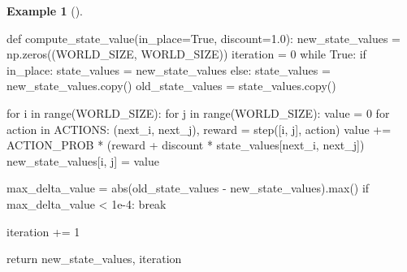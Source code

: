 \documentclass[
  letterpaper,
]{krantz}
\makeatletter
\newenvironment{Shaded}{\begin{snugshade}}{\end{snugshade}}
\newcommand{\BuiltInTok}[1]{\textcolor[rgb]{0.00,0.23,0.31}{#1}}
\newcommand{\ControlFlowTok}[1]{\textcolor[rgb]{0.00,0.23,0.31}{#1}}
\newcommand{\DecValTok}[1]{\textcolor[rgb]{0.68,0.00,0.00}{#1}}
\newcommand{\FloatTok}[1]{\textcolor[rgb]{0.68,0.00,0.00}{#1}}
\newcommand{\KeywordTok}[1]{\textcolor[rgb]{0.00,0.23,0.31}{#1}}
\newcommand{\NormalTok}[1]{\textcolor[rgb]{0.00,0.23,0.31}{#1}}
\newcommand{\OperatorTok}[1]{\textcolor[rgb]{0.37,0.37,0.37}{#1}}
\newcommand{\VariableTok}[1]{\textcolor[rgb]{0.07,0.07,0.07}{#1}}
\newenvironment{kframe}{%
\medskip{}
\setlength{\fboxsep}{.8em}
 \def\at@end@of@kframe{}%
 \ifinner\ifhmode%
  \def\at@end@of@kframe{\end{minipage}}%
  \begin{minipage}{\columnwidth}%
 \fi\fi%
 \def\FrameCommand##1{\hskip\@totalleftmargin \hskip-\fboxsep
 \colorbox{shadecolor}{##1}\hskip-\fboxsep
     \hskip-\linewidth \hskip-\@totalleftmargin \hskip\columnwidth}%
 \MakeFramed {\advance\hsize-\width
   \@totalleftmargin\z@ \linewidth\hsize
   \@setminipage}}%
 {\par\unskip\endMakeFramed%
 \at@end@of@kframe}
\renewenvironment{Shaded}{\begin{kframe}}{\end{kframe}}
\theoremstyle{plain}
\theoremstyle{definition}
\newtheorem{example}{Example}[chapter]
\theoremstyle{definition}
\theoremstyle{remark}
\makeatother
\begin{document}
\begin{example}[]
\begin{tcolorbox}[enhanced jigsaw, bottomrule=.15mm, opacityback=0, breakable, colframe=quarto-callout-tip-color-frame, left=2mm, rightrule=.15mm, toprule=.15mm, leftrule=.75mm, arc=.35mm, colback=white]
\begin{codelisting}[H]
\begin{Shaded}
\begin{Highlighting}[]
\KeywordTok{def}\NormalTok{ compute\_state\_value(in\_place}\OperatorTok{=}\VariableTok{True}\NormalTok{, discount}\OperatorTok{=}\FloatTok{1.0}\NormalTok{):}
\NormalTok{    new\_state\_values }\OperatorTok{=}\NormalTok{ np.zeros((WORLD\_SIZE, WORLD\_SIZE))}
\NormalTok{    iteration }\OperatorTok{=} \DecValTok{0}
    \ControlFlowTok{while} \VariableTok{True}\NormalTok{:}
        \ControlFlowTok{if}\NormalTok{ in\_place:}
\NormalTok{            state\_values }\OperatorTok{=}\NormalTok{ new\_state\_values}
        \ControlFlowTok{else}\NormalTok{:}
\NormalTok{            state\_values }\OperatorTok{=}\NormalTok{ new\_state\_values.copy()}
\NormalTok{        old\_state\_values }\OperatorTok{=}\NormalTok{ state\_values.copy()}

        \ControlFlowTok{for}\NormalTok{ i }\KeywordTok{in} \BuiltInTok{range}\NormalTok{(WORLD\_SIZE):}
            \ControlFlowTok{for}\NormalTok{ j }\KeywordTok{in} \BuiltInTok{range}\NormalTok{(WORLD\_SIZE):}
\NormalTok{                value }\OperatorTok{=} \DecValTok{0}
                \ControlFlowTok{for}\NormalTok{ action }\KeywordTok{in}\NormalTok{ ACTIONS:}
\NormalTok{                    (next\_i, next\_j), reward }\OperatorTok{=}\NormalTok{ step([i, j], action)}
\NormalTok{                    value }\OperatorTok{+=}\NormalTok{ ACTION\_PROB }\OperatorTok{*}\NormalTok{ (reward }\OperatorTok{+}\NormalTok{ discount }\OperatorTok{*}\NormalTok{ state\_values[next\_i, next\_j])}
\NormalTok{                new\_state\_values[i, j] }\OperatorTok{=}\NormalTok{ value}

\NormalTok{        max\_delta\_value }\OperatorTok{=} \BuiltInTok{abs}\NormalTok{(old\_state\_values }\OperatorTok{{-}}\NormalTok{ new\_state\_values).}\BuiltInTok{max}\NormalTok{()}
        \ControlFlowTok{if}\NormalTok{ max\_delta\_value }\OperatorTok{\textless{}} \FloatTok{1e{-}4}\NormalTok{:}
            \ControlFlowTok{break}

\NormalTok{        iteration }\OperatorTok{+=} \DecValTok{1}

    \ControlFlowTok{return}\NormalTok{ new\_state\_values, iteration}


\end{Highlighting}
\end{Shaded}
\end{codelisting}
\end{tcolorbox}
\end{example}
\end{document}
